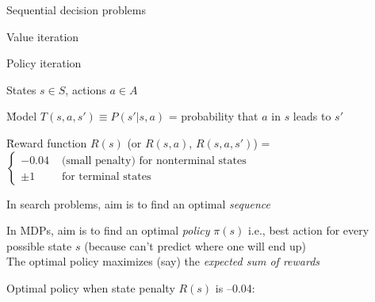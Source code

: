 \documentclass{article}
\begin{document}
\begin{huge}

\sf


\blob Sequential decision problems

\blob Value iteration

\blob Policy iteration



\vspace*{0.3in}

\textwidth
{}




\vspace*{0.3in}

\centerline{%
\textwidth
{}\hspace*{1in}%
\textwidth
{}}

States $s \in S$, actions $a \in A$

\u{Model} $T(s,a,s') \equiv P(s'|s,a)$ = probability that $a$ in $s$ leads to $s'$

\u{Reward function} $R(s)$ (or $R(s,a)$, $R(s,a,s')$)\nl
   = $\left\{\begin{array}{ll} -0.04 & \mbox{ (small penalty) for nonterminal states}\\
                               \pm 1 & \mbox{ for terminal states}\end{array}\right.$



In search problems, aim is to find an optimal {\em sequence}

In MDPs, aim is to find an optimal {\em policy} $\pi(s)$\nl
   i.e., best action for every possible state $s$\nl
   (because can't predict where one will end up)\\
The optimal policy maximizes (say) the {\em expected sum of rewards}

Optimal policy when state penalty $R(s)$ is --0.04:


\end{huge}
\end{document}

